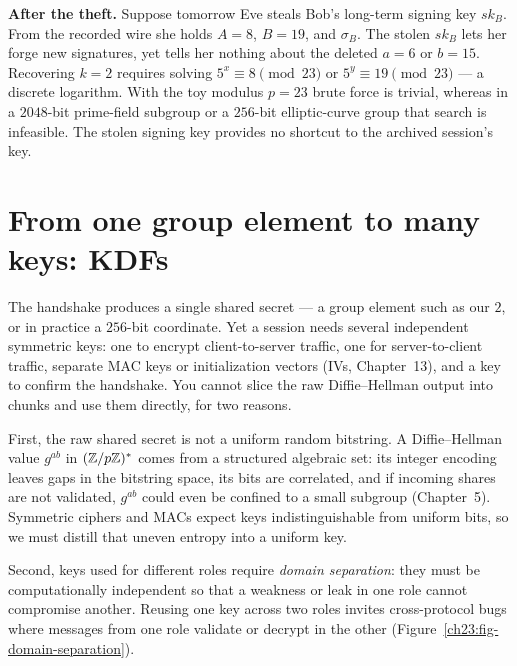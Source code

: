 \textbf{After the theft.} Suppose tomorrow Eve steals Bob's long-term signing
key $sk_B$. From the recorded wire she holds $A=8$, $B=19$, and $\sigma_B$. The
stolen $sk_B$ lets her forge new signatures, yet tells her nothing about the
deleted $a=6$ or $b=15$. Recovering $k=2$ requires solving $5^x \equiv 8 \pmod{23}$
or $5^y \equiv 19 \pmod{23}$ --- a discrete logarithm. With the toy modulus
$p=23$ brute force is trivial, whereas in a $2048$-bit prime-field subgroup or a
$256$-bit elliptic-curve group that search is infeasible. The stolen signing key
provides no shortcut to the archived session's key.

\section{From one group element to many keys: KDFs}

The handshake produces a single shared secret --- a group element such as our
$2$, or in practice a $256$-bit coordinate. Yet a session needs several
independent symmetric keys: one to encrypt client-to-server traffic, one for
server-to-client traffic, separate MAC keys or initialization vectors (IVs,
Chapter~13), and a key to confirm the handshake. You cannot slice the raw
Diffie--Hellman output into chunks and use them directly, for two reasons.

First, the raw shared secret is not a uniform random bitstring. A
Diffie--Hellman value $g^{ab}$ in $(\mathbb{Z}/p\mathbb{Z})^{*}$ comes from a structured algebraic
set: its integer encoding leaves gaps in the bitstring space, its bits are
correlated, and if incoming shares are not validated, $g^{ab}$ could even be
confined to a small subgroup (Chapter~5). Symmetric ciphers and MACs expect keys
indistinguishable from uniform bits, so we must distill that uneven entropy into
a uniform key.

Second, keys used for different roles require \emph{domain separation}: they
must be computationally independent so that a weakness or leak in one role
cannot compromise another. Reusing one key across two roles invites
cross-protocol bugs where messages from one role validate or decrypt in the
other (Figure~\ref{ch23:fig-domain-separation}).

